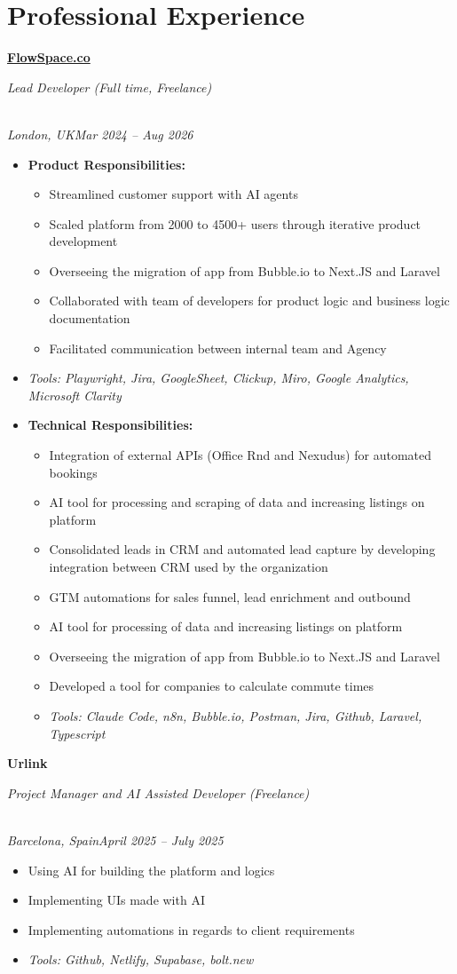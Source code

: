 \documentclass[a4paper,10pt]{article}
\newcommand{\role}[4]{\vspace{3pt}\noindent\hspace{0.6em}\parbox[t]{0.38\textwidth}{\raggedright\textbf{#1}}\hfill\parbox[t]{0.58\textwidth}{\raggedleft\textit{#2}}\\{\textit{#3}\hfill\textit{#4}}\vspace{1pt}}
\begin{document}
\section{Professional Experience}
\role{\href{https://flowspace.co}{FlowSpace.co}}{Lead Developer (Full time, Freelance)}{London, UK}{Mar 2024 -- Aug 2026}
\begin{itemize}
\item \textbf{Product Responsibilities:}
\begin{itemize}[label=--]
\item Streamlined customer support with AI agents
\item Scaled platform from 2000 to 4500+ users through iterative product development
\item Overseeing the migration of app from Bubble.io to Next.JS and Laravel
\item Collaborated with team of developers for product logic and business logic documentation
\item Facilitated communication between internal team and Agency
\end{itemize}
\item \textit{Tools: Playwright, Jira, GoogleSheet, Clickup, Miro, Google Analytics, Microsoft Clarity}
\item \textbf{Technical Responsibilities:}
\begin{itemize}[label=--]
\item Integration of external APIs (Office Rnd and Nexudus) for automated bookings
\item AI tool for processing and scraping of data and increasing listings on platform
\item Consolidated leads in CRM and automated lead capture by developing integration between CRM used by the organization
\item GTM automations for sales funnel, lead enrichment and outbound
\item AI tool for processing of data and increasing listings on platform
\item Overseeing the migration of app from Bubble.io to Next.JS and Laravel
\item Developed a tool for companies to calculate commute times
\item \textit{Tools: Claude Code, n8n, Bubble.io, Postman, Jira, Github, Laravel, Typescript}
\end{itemize}
\end{itemize}

\role{Urlink}{Project Manager and AI Assisted Developer (Freelance)}{Barcelona, Spain}{April 2025 -- July 2025}
\begin{itemize}
\item Using AI for building the platform and logics
\item Implementing UIs made with AI
\item Implementing automations in regards to client requirements
\item \textit{Tools: Github, Netlify, Supabase, bolt.new}
\end{itemize}
\end{document}
